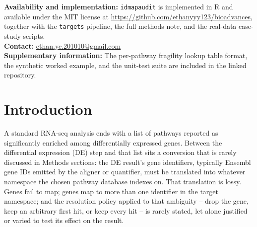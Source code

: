 \documentclass[webpdf,contemporary,large]{oup-authoring-template}
\theoremstyle{thmstyleone}%
\theoremstyle{thmstyletwo}%
\theoremstyle{thmstylethree}%
\begin{document}
{\textbf{Availability and implementation:} \texttt{idmapaudit} is implemented in R and available under the MIT license at \url{https://github.com/ethanyyy123/bioadvances}, together with the \texttt{targets} pipeline, the full methods note, and the real-data case-study scripts.\\
\textbf{Contact:} \href{mailto:ethan.ye.201010@gmail.com}{ethan.ye.201010@gmail.com}\\
\textbf{Supplementary information:} The per-pathway fragility lookup table format, the synthetic worked example, and the unit-test suite are included in the linked repository.}


\maketitle

\section{Introduction}\label{sec:intro}

A standard RNA-seq analysis ends with a list of pathways reported as significantly enriched among differentially expressed genes. Between the differential expression (DE) step and that list sits a conversion that is rarely discussed in Methods sections: the DE result's gene identifiers, typically Ensembl gene IDs emitted by the aligner or quantifier, must be translated into whatever namespace the chosen pathway database indexes on. That translation is lossy. Genes fail to map; genes map to more than one identifier in the target namespace; and the resolution policy applied to that ambiguity -- drop the gene, keep an arbitrary first hit, or keep every hit -- is rarely stated, let alone justified or varied to test its effect on the result.
\end{document}
